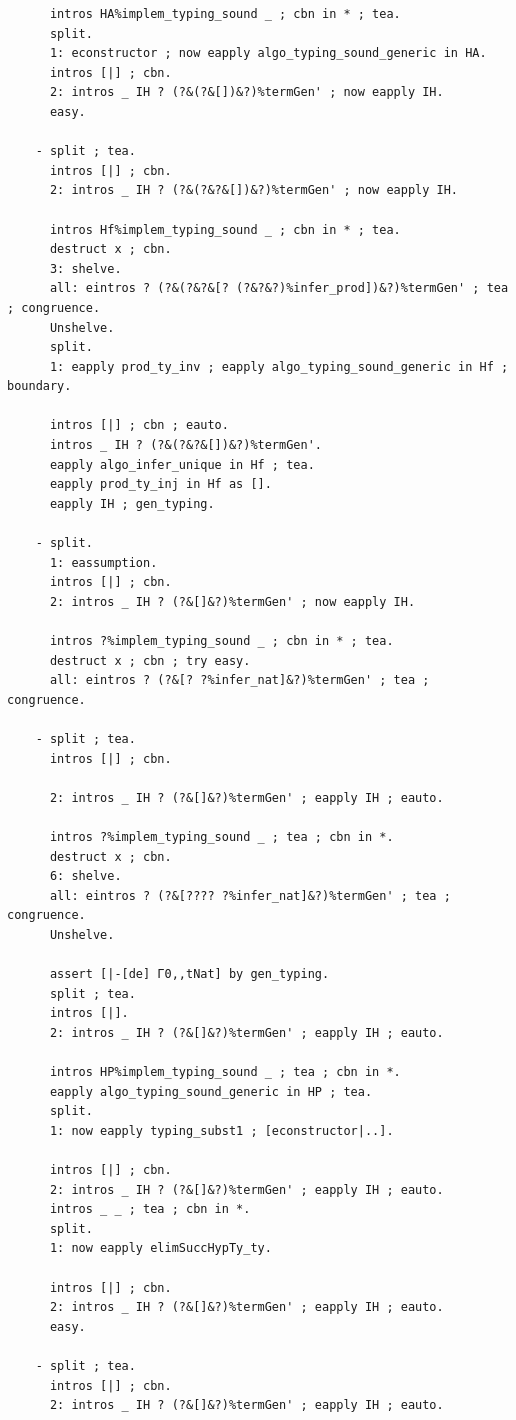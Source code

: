 \begin{lstlisting}
      intros HA%implem_typing_sound _ ; cbn in * ; tea.
      split.
      1: econstructor ; now eapply algo_typing_sound_generic in HA.
      intros [|] ; cbn.
      2: intros _ IH ? (?&(?&[])&?)%termGen' ; now eapply IH.
      easy.

    - split ; tea.
      intros [|] ; cbn.
      2: intros _ IH ? (?&(?&?&[])&?)%termGen' ; now eapply IH.

      intros Hf%implem_typing_sound _ ; cbn in * ; tea.
      destruct x ; cbn.
      3: shelve.
      all: eintros ? (?&(?&?&[? (?&?&?)%infer_prod])&?)%termGen' ; tea ; congruence.
      Unshelve.
      split.
      1: eapply prod_ty_inv ; eapply algo_typing_sound_generic in Hf ; boundary.

      intros [|] ; cbn ; eauto.
      intros _ IH ? (?&(?&?&[])&?)%termGen'.
      eapply algo_infer_unique in Hf ; tea.
      eapply prod_ty_inj in Hf as [].
      eapply IH ; gen_typing.

    - split.
      1: eassumption.
      intros [|] ; cbn.
      2: intros _ IH ? (?&[]&?)%termGen' ; now eapply IH.
      
      intros ?%implem_typing_sound _ ; cbn in * ; tea.
      destruct x ; cbn ; try easy.
      all: eintros ? (?&[? ?%infer_nat]&?)%termGen' ; tea ; congruence.

    - split ; tea.
      intros [|] ; cbn.

      2: intros _ IH ? (?&[]&?)%termGen' ; eapply IH ; eauto.

      intros ?%implem_typing_sound _ ; tea ; cbn in *.
      destruct x ; cbn.
      6: shelve.
      all: eintros ? (?&[???? ?%infer_nat]&?)%termGen' ; tea ; congruence.
      Unshelve.

      assert [|-[de] Γ0,,tNat] by gen_typing.
      split ; tea.
      intros [|].
      2: intros _ IH ? (?&[]&?)%termGen' ; eapply IH ; eauto.

      intros HP%implem_typing_sound _ ; tea ; cbn in *.
      eapply algo_typing_sound_generic in HP ; tea.
      split.
      1: now eapply typing_subst1 ; [econstructor|..].

      intros [|] ; cbn.
      2: intros _ IH ? (?&[]&?)%termGen' ; eapply IH ; eauto.
      intros _ _ ; tea ; cbn in *.
      split.
      1: now eapply elimSuccHypTy_ty.
      
      intros [|] ; cbn.
      2: intros _ IH ? (?&[]&?)%termGen' ; eapply IH ; eauto.
      easy.

    - split ; tea.
      intros [|] ; cbn.
      2: intros _ IH ? (?&[]&?)%termGen' ; eapply IH ; eauto.


\end{lstlisting}

